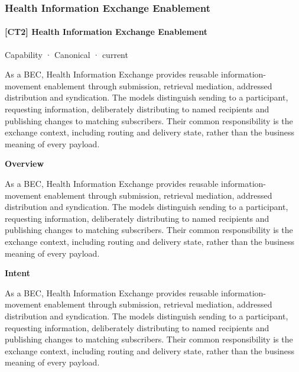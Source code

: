 \subsubsection{Health Information Exchange Enablement}

\paragraph{[CT2] Health Information Exchange Enablement}

\label{element:a61a15908ed544e6acf3e9cab63a0267}
{\small Capability · Canonical · current}\par

As a BEC, Health Information Exchange provides reusable information-movement enablement through submission, retrieval mediation, addressed distribution and syndication. The models distinguish sending to a participant, requesting information, deliberately distributing to named recipients and publishing changes to matching subscribers. Their common responsibility is the exchange context, including routing and delivery state, rather than the business meaning of every payload.



\textbf{Overview}



As a BEC, Health Information Exchange provides reusable information-movement enablement through submission, retrieval mediation, addressed distribution and syndication. The models distinguish sending to a participant, requesting information, deliberately distributing to named recipients and publishing changes to matching subscribers. Their common responsibility is the exchange context, including routing and delivery state, rather than the business meaning of every payload.



\textbf{Intent}



As a BEC, Health Information Exchange provides reusable information-movement enablement through submission, retrieval mediation, addressed distribution and syndication. The models distinguish sending to a participant, requesting information, deliberately distributing to named recipients and publishing changes to matching subscribers. Their common responsibility is the exchange context, including routing and delivery state, rather than the business meaning of every payload.



